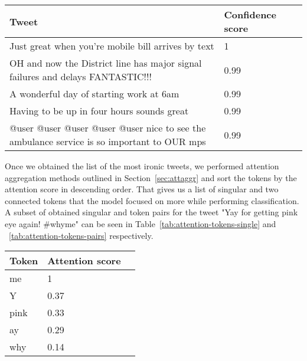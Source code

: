 \documentclass[10pt, a4paper]{article}
\begin{document}
\begin{table*}
\caption{Most Ironic Tweets in the Test Set}
\label{tab:most-ironic-test}
\begin{center}
\begin{tabular}{llr}
\toprule
Tweet & Confidence score\\
\midrule
Just great when you're mobile bill arrives by text                                          & 1 \\
OH and now the District line has major signal failures and delays FANTASTIC!!!              & 0.99 \\
A wonderful day of starting work at 6am                                                     & 0.99 \\
Having to be up in four hours sounds great                                                  & 0.99 \\
@user @user @user @user @user  nice to see the ambulance service is so important to OUR mps & 0.99 \\
\bottomrule
\end{tabular}
\end{center}
\end{table*}

Once we obtained the list of the most ironic tweets, we performed attention aggregation methods outlined in Section~\ref{sec:attaggr} and sort the tokens by the attention score in descending order.
That gives us a list of singular and two connected tokens that the model focused on more while performing classification.
A subset of obtained singular and token pairs for the tweet "Yay for getting pink eye again!  \#whyme" can be seen in Table~\ref{tab:attention-tokens-single} and ~\ref{tab:attention-tokens-pairs} respectively.

\begin{table*}
\caption{Single Tokens With Highest Attention}
\label{tab:attention-tokens-single}
\begin{center}
\begin{tabular}{llr}
\toprule
Token & Attention score\\
\midrule
me    & 1 \\
Y     & 0.37 \\
pink  & 0.33 \\
ay    & 0.29 \\
why   & 0.14 \\
\bottomrule
\end{tabular}
\end{center}
\end{table*}
\end{document}
